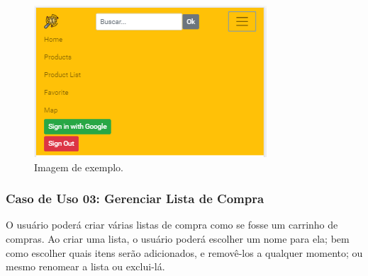 \begin{figure}[!htb]
\centering
\caption{Imagem de exemplo.}
\includegraphics[width=\linewidth]{figuras/tela-menu.png}
\end{figure}

\subsubsection{Caso de Uso 03: Gerenciar Lista de Compra}

O usuário poderá criar várias listas de compra como se fosse um carrinho de compras. Ao criar uma lista, o usuário poderá escolher um nome para ela; bem como escolher quais itens serão adicionados, e removê-los a qualquer momento; ou mesmo renomear a lista ou exclui-lá.

